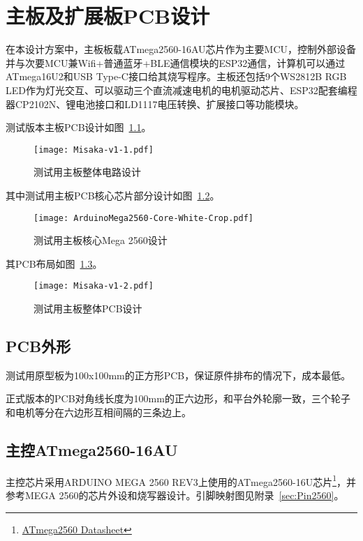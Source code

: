 \chapter{主板及扩展板PCB设计}
\label{cha:PCB}

在本设计方案中，主板板载ATmega2560-16AU芯片作为主要MCU，控制外部设备并与次要MCU兼Wifi+普通蓝牙+BLE通信模块的ESP32通信，计算机可以通过ATmega16U2和USB Type-C接口给其烧写程序。主板还包括9个WS2812B RGB LED作为灯光交互、可以驱动三个直流减速电机的电机驱动芯片、ESP32配套编程器CP2102N、锂电池接口和LD1117电压转换、扩展接口等功能模块。


测试版本主板PCB设计如图~\ref{fig:Misaka-v1}。

\begin{figure}[htbp]
    \centering
    \texttt{[image: Misaka-v1-1.pdf]}
    \caption{测试用主板整体电路设计}
    \label{fig:Misaka-v1}
\end{figure}

其中测试用主板PCB核心芯片部分设计如图~\ref{fig:CorePCB}。

\begin{figure}[htbp]
    \centering
    \texttt{[image: ArduinoMega2560-Core-White-Crop.pdf]}
    \caption{测试用主板核心Mega 2560设计}
    \label{fig:CorePCB}
\end{figure}

其PCB布局如图~\ref{fig:Misaka-v1-2}。

\begin{figure}[htbp]
    \centering
    \texttt{[image: Misaka-v1-2.pdf]}
    \caption{测试用主板整体PCB设计}
    \label{fig:Misaka-v1-2}
\end{figure}

\section{PCB外形}

测试用原型板为100x100mm的正方形PCB，保证原件排布的情况下，成本最低。

正式版本的PCB对角线长度为100mm的正六边形，和平台外轮廓一致，三个轮子和电机等分在六边形互相间隔的三条边上。

\section{主控ATmega2560-16AU}

主控芯片采用ARDUINO MEGA 2560 REV3\cite{arduino_mega-2560-r3}上使用的ATmega2560-16U芯片\footnote{\href{http://www.atmel.com/Images/Atmel-2549-8-bit-AVR-Microcontroller-ATmega640-1280-1281-2560-2561_datasheet.pdf}{ATmega2560 Datasheet}}，并参考MEGA 2560的芯片外设和烧写器设计。引脚映射图见附录~\ref{sec:Pin2560}。

